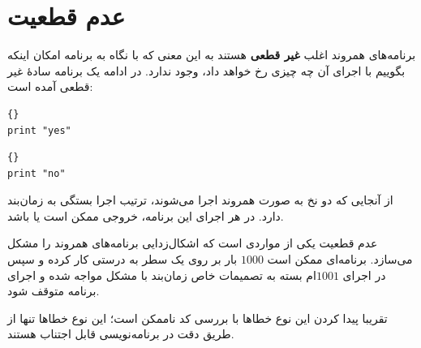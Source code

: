 \documentclass{book}
\begin{document}
\section{عدم قطعیت}

    برنامه‌های همروند اغلب \textbf{غیر قطعی} هستند به این معنی که با نگاه به برنامه 
    امکان اینکه بگوییم با اجرای آن چه چیزی رخ خواهد داد، وجود ندارد. در ادامه یک برنامه سادهٔ غیر قطعی آمده است:

\begin{latin}
\begin{minipage}[t]{2in}
\begin{latin}
\begin{lstlisting}[title=\rl{نخ \lr{A}}]{}
print "yes"
\end{lstlisting}
\end{latin}
\end{minipage}
\hfill
\begin{minipage}[t]{2in}
\begin{latin}
\begin{lstlisting}[title=\rl{نخ \lr{‌B}}]{}
print "no"
\end{lstlisting}
\end{latin}
\end{minipage}
\end{latin}

    از آنجایی که دو نخ به صورت همروند اجرا می‌شوند، ترتیب اجرا بستگی به زمان‌بند دارد. در هر اجرای این برنامه، خروجی ممکن است 
      یا 
     باشد. 
     
    عدم قطعیت یکی از مواردی است که اشکال‌زدایی برنامه‌های همروند را مشکل می‌سازد. برنامه‌ای ممکن است $1000$ بار بر روی یک سطر به درستی 
    کار کرده و سپس در اجرای $1001$ام بسته به تصمیمات خاص زمان‌بند با مشکل مواجه شده و اجرای برنامه متوقف شود. 
    
    تقریبا پیدا کردن این نوع خطاها با بررسی کد ناممکن است؛  این نوع  خطاها تنها از طریق دقت در برنامه‌نویسی قابل اجتناب هستند. 
\end{document}
